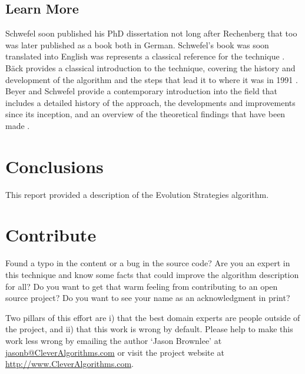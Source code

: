 \documentclass[a4paper, 11pt]{article}
\makeatletter
\newcommand{\myreportauthor}{Jason Brownlee}
\newcommand{\myreportemail}{jasonb@CleverAlgorithms.com}
\newcommand{\myreportwebsite}{http://www.CleverAlgorithms.com}
\makeatother
\begin{document}
% 
\subsection{Learn More}
Schwefel soon published his PhD dissertation \cite{Schwefel1975} not long after Rechenberg that too was later published as a book \cite{Schwefel1977} both in German. Schwefel's book was soon translated into English was represents a classical reference for the technique \cite{Schwefel1981}. 
B\"ack provides a classical introduction to the technique, covering the history and development of the algorithm and the steps that lead it to where it was in 1991 \cite{Back1991}.
Beyer and Schwefel provide a contemporary introduction into the field that includes a detailed history of the approach, the developments and improvements since its inception, and an overview of the theoretical findings that have been made \cite{Beyer2002}.

% 
% 
\section{Conclusions}
\label{sec:conclusions}
This report provided a description of the Evolution Strategies algorithm.

% 
% 
\section{Contribute}
\label{sec:contribute}
Found a typo in the content or a bug in the source code? 
Are you an expert in this technique and know some facts that could improve the algorithm description for all?
Do you want to get that warm feeling from contributing to an open source project? 
Do you want to see your name as an acknowledgment in print?

Two pillars of this effort are i) that the best domain experts are people outside of the project, and ii) that this work is wrong by default. 
Please help to make this work less wrong by emailing the author `\myreportauthor' at \url{\myreportemail} or visit the project website at \url{\myreportwebsite}.



\end{document}
